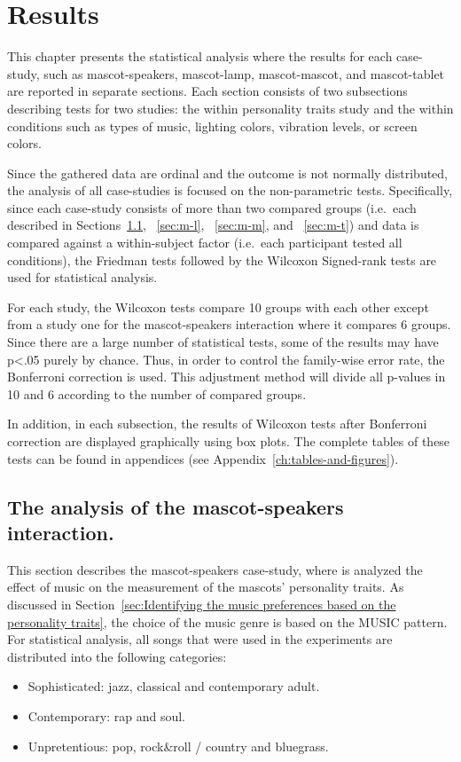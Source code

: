 \chapter{Results}
\label{ch:results}
This chapter presents the statistical analysis where the results
for each case-study, such as mascot-speakers, mascot-lamp, mascot-mascot, and
mascot-tablet are reported in separate sections.
Each section consists of two subsections describing tests for two
studies: the within personality traits study and the within conditions such as types of music, lighting colors,
vibration levels, or screen colors.

Since the gathered data are ordinal and the outcome
is not normally distributed, the analysis of all case-studies is focused on the non-parametric tests.
Specifically, since each case-study consists of more than two compared groups
(i.e.\ each described in Sections~\ref{sec:m-s}, ~\ref{sec:m-l}, ~\ref{sec:m-m}, and ~\ref{sec:m-t})
and data is compared against a within-subject factor (i.e.\ each participant tested all conditions),
the Friedman tests followed by the Wilcoxon Signed-rank tests are used for statistical analysis.

For each study, the Wilcoxon tests compare 10 groups with each other except from a
study one for the mascot-speakers interaction where it compares 6 groups.
Since there are a large number of statistical tests,
some of the results may have p<.05 purely by chance.
Thus, in order to control the family-wise error rate, the Bonferroni
correction is used.
This adjustment method will divide all p-values in 10 and 6 according to the number of compared groups.

In addition, in each subsection, the results of Wilcoxon tests after Bonferroni correction are
displayed graphically using box plots.
The complete tables of these tests can be found in appendices (see Appendix~\ref{ch:tables-and-figures}).

\section{The analysis of the mascot-speakers interaction.}
\label{sec:m-s}
This section describes the mascot-speakers case-study, where is analyzed the effect of music
on the measurement of the mascots' personality traits.
As discussed in Section~\ref{sec:Identifying the music preferences based on the personality traits},
the choice of the music genre is based on the MUSIC pattern.
For statistical analysis, all songs that were used in the experiments are
distributed into the following categories:
\begin{itemize}
    \item Sophisticated: jazz, classical and contemporary adult.
    \item Contemporary: rap and soul.
    \item Unpretentious: pop, rock\&roll / country and bluegrass.
\end{itemize}

